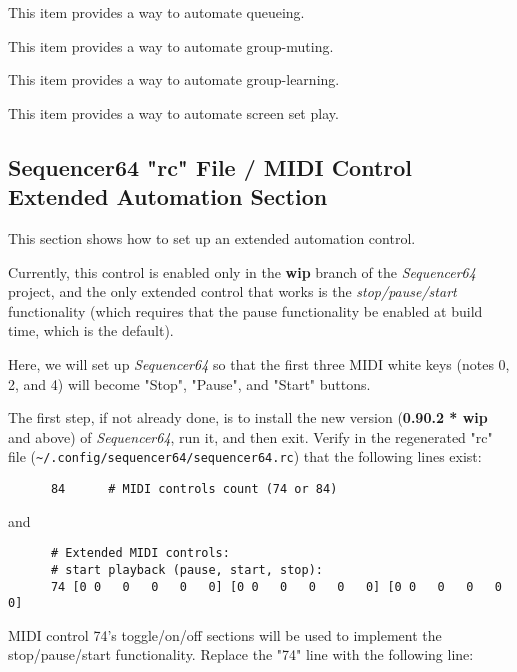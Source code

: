    This item provides a way to automate queueing.

   This item provides a way to automate group-muting.

   This item provides a way to automate group-learning.

   This item provides a way to automate screen set play.

\subsection{Sequencer64 "rc" File / MIDI Control Extended Automation Section}
\label{subsubsec:seq64_rc_file_midi_control_extended_automation_group}

   This section shows how to set up an extended automation control.

   Currently, this control is enabled only in the \textbf{wip} branch of the
   \textsl{Sequencer64} project, and the only extended control that works is
   the \textsl{stop/pause/start} functionality (which requires that the pause
   functionality be enabled at build time, which is the default).

   Here, we will set up \textsl{Sequencer64} so that the first three MIDI
   white keys (notes 0, 2, and 4) will become "Stop", "Pause", and "Start"
   buttons.

   The first step, if not already done, is to install the new version
   (\textbf{0.90.2 * wip} and above) of \textsl{Sequencer64},
   run it, and then exit.
   Verify in the regenerated "rc" file
   (\texttt{\textasciitilde/.config/sequencer64/sequencer64.rc}) that the
   following lines exist:

   \begin{verbatim}
      84      # MIDI controls count (74 or 84)
   \end{verbatim}

   and

   \begin{verbatim}
      # Extended MIDI controls:
      # start playback (pause, start, stop):
      74 [0 0   0   0   0   0] [0 0   0   0   0   0] [0 0   0   0   0   0]
   \end{verbatim}

   MIDI control 74's toggle/on/off sections will be used to implement the
   stop/pause/start functionality.  Replace the "74" line with the following
   line:

